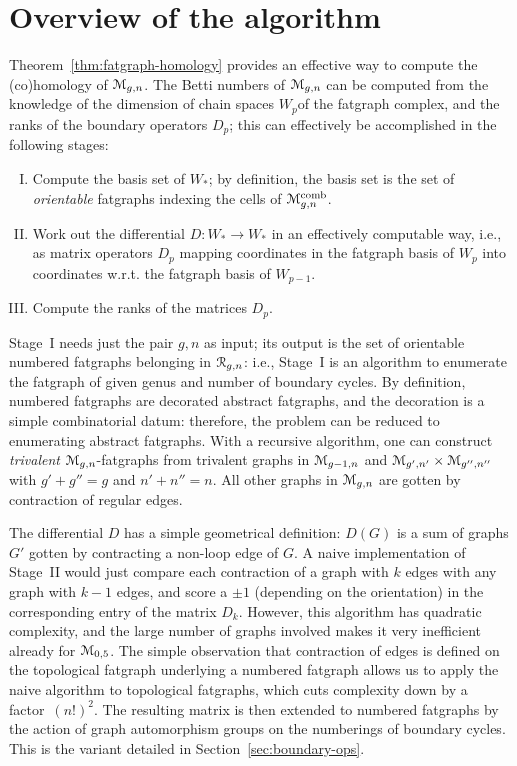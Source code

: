 \section[Overview]{Overview of the algorithm}
\label{sec:overview}

Theorem~\ref{thm:fatgraph-homology} provides an effective way to compute the
(co)homology of $\mathcal{M}_{g,n}$.  The Betti numbers of $\mathcal{M}_{g,n}$ can be
computed from the knowledge of the dimension of chain spaces $W_p$of
the fatgraph complex, and the ranks of the boundary operators $D_p$;
this can effectively be accomplished in the following stages:
\begin{enumerate}[I.]
\item Compute the basis set of $W_*$; by definition, the basis set is
  the set of \emph{orientable} fatgraphs indexing
  the cells of $\mathcal{M}\sp{\text{comb}}_{g,n}$.
\item Work out the differential $D: W_* \to W_*$ in an
  effectively computable way, i.e., as matrix operators $D_p$ mapping
  coordinates in the fatgraph basis of $W_p$ into coordinates
  w.r.t. the fatgraph basis of $W_{p-1}$.
\item Compute the ranks of the matrices $D_p$.
\end{enumerate}

Stage~I needs just the pair $g,n$ as input; its output is the set of
orientable numbered fatgraphs belonging in $\mathcal{R}_{g,n}$: i.e., Stage~I
is an algorithm to enumerate the fatgraph of given genus and number of
boundary cycles. By definition, numbered fatgraphs are decorated
abstract fatgraphs, and the decoration is a simple combinatorial
datum: therefore, the problem can be reduced to enumerating abstract
fatgraphs.  With a recursive algorithm, one can construct
\emph{trivalent} $\mathcal{M}_{g,n}$-fatgraphs from trivalent graphs in
$\mathcal{M}_{g-1,n}$ and $\mathcal{M}_{g',n'} \times \mathcal{M}_{g'',n''}$ with $g'+g''=g$ and
$n'+n''=n$.  All other graphs in $\mathcal{M}_{g,n}$ are gotten by contraction
of regular edges.

The differential $D$ has a simple geometrical definition: $D(G)$ is a
sum of graphs $G'$ gotten by contracting a non-loop edge of $G$. A
naive implementation of Stage~II would just compare each contraction
of a graph with $k$ edges with any graph with $k-1$ edges, and score a
$\pm 1$ (depending on the orientation) in the corresponding entry of
the matrix $D_k$.  However, this algorithm has quadratic complexity,
and the large number of graphs involved makes it very inefficient
already for $\mathcal{M}_{0,5}$.  The simple observation that contraction of
edges is defined on the topological fatgraph underlying a numbered
fatgraph allows us to apply the naive algorithm to topological
fatgraphs, which cuts complexity down by a factor~$(n!)^2$.  The
resulting matrix is then extended to numbered fatgraphs by the action
of graph automorphism groups on the numberings of boundary cycles.
This is the variant detailed in Section~\ref{sec:boundary-ops}.

